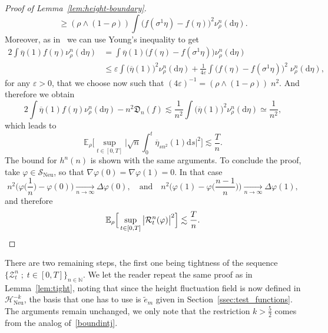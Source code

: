 \documentclass[AHL,Unicode,longabstracts]{cedram}
\DeclareMathOperator{\Neu}{Neu}
\newcommand{\bb}[1]{{\mathbb #1}}
\newcommand{\mc}[1]{{\mathcal #1}}
\renewcommand{\mc}[1]{{\mathcal #1}}
\newcommand{\SN}{\ensuremath{\mc S_{\Neu}}}
\renewcommand{\bar}{\overline}
\renewcommand{\leq}{\leqslant}
\renewcommand{\ge}{\geqslant}
\renewcommand{\tilde}{\widetilde}
\newcommand*{\dd}{\mathrm{d}}
\newcommand*{\ds}{\dd s}
\renewcommand{\tfrac}{\frac}
\begin{document}
\begin{proof}[Proof of Lemma~\ref{lem:height-boundary}]
\[\ge (\rho \wedge (1-\rho)) \int \big(f (\sigma^1 \eta) - f (\eta)\big)^2 \nu^n_\rho(\dd\eta).
\]
Moreover, as in~\cite[Lemma~3]{Franco2016} we can use Young's inequality to get
\begin{align*}
2\int \bar\eta (1) f(\eta) \nu^n_\rho(\dd\eta) & = \int \bar\eta (1) \big(f (\eta) - f (\sigma^1 \eta)\big) \nu^n_\rho(\dd\eta) \\ & \leq \varepsilon \int \big(\bar\eta(1)\big)^2 \nu^n_\rho(\dd\eta) + \frac{1}{4\varepsilon}\int \big(f (\eta) - f (\sigma^1 \eta)\big)^2 \; \nu^n_\rho(\dd\eta),
\end{align*}
for any $\varepsilon >0$, that we choose now such that $(4\varepsilon)^{-1} = {(\rho \wedge (1-\rho))\; n^2}$. And therefore we obtain
\[
2
\int \bar\eta (1) f(\eta) \nu^n_\rho(\dd\eta) - n^2\mathfrak{D}_n(f)
\lesssim \frac{1}{n^2} \int \big(\bar\eta(1)\big)^2 \nu^n_\rho(\dd\eta) \simeq \frac{1}{n^2},
\]
which leads to
\[
\mathbb{E}_{\rho} \Bigg[\sup_{t \in [0,T]} \bigg|\sqrt n \int_0^t
\bar\eta_{sn^2} (1) \ds \bigg|^2 \Bigg] \lesssim
\frac{T}{n}.
\]
The bound for $h^n (n)$ is shown with the same arguments. To conclude the proof, take $\varphi \in \SN$, so that $\nabla \varphi(0)=\nabla\varphi(1)=0$. In that case
\[
n^2\Big(\varphi\Big(\tfrac1n\Big)-\varphi(0)\Big) \xrightarrow[n\to\infty]{}\Delta\varphi(0), \quad \text{and}\quad n^2\Big(\varphi(1)-\varphi\Big(\tfrac{n-1}{n}\Big)\Big) \xrightarrow[n\to\infty]{}\Delta\varphi(1),
\]
and therefore
\[
\bb E_\rho\Big[\sup_{t\in[0,T]} \big|\mc R_t^n(\varphi)\big|^2\Big] \lesssim \frac{T}{n}.\qedhere
\]
\end{proof}

There are two remaining steps, the first one being tightness of the sequence $\{\mc Z_t^n \; ; \; t \in [0,T]\}_{n\in\bb N}$. We let the reader repeat the same proof as in Lemma~\ref{lem:tight}, noting that since the height fluctuation field is now defined in $\mc H_{\Neu}^{-k}$, the basis that one has to use is $\tilde e_m$ given in Section~\ref{ssec:test_functions}. The arguments remain unchanged, we only note that the restriction $k>\frac52$ comes from the analog of~\eqref{boundintj}.
\end{document}
